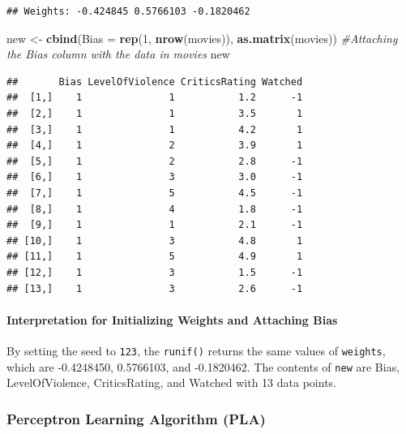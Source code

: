 \documentclass[
]{article}
\newenvironment{Shaded}{\begin{snugshade}}{\end{snugshade}}
\newcommand{\AttributeTok}[1]{\textcolor[rgb]{0.13,0.29,0.53}{#1}}
\newcommand{\CommentTok}[1]{\textcolor[rgb]{0.56,0.35,0.01}{\textit{#1}}}
\newcommand{\DecValTok}[1]{\textcolor[rgb]{0.00,0.00,0.81}{#1}}
\newcommand{\FunctionTok}[1]{\textcolor[rgb]{0.13,0.29,0.53}{\textbf{#1}}}
\newcommand{\NormalTok}[1]{#1}
\newcommand{\OtherTok}[1]{\textcolor[rgb]{0.56,0.35,0.01}{#1}}
\begin{document}
\begin{verbatim}
## Weights: -0.424845 0.5766103 -0.1820462
\end{verbatim}

\begin{Shaded}
\begin{Highlighting}[]
\NormalTok{new }\OtherTok{\textless{}{-}} \FunctionTok{cbind}\NormalTok{(}\AttributeTok{Bias =} \FunctionTok{rep}\NormalTok{(}\DecValTok{1}\NormalTok{, }\FunctionTok{nrow}\NormalTok{(movies)), }\FunctionTok{as.matrix}\NormalTok{(movies)) }\CommentTok{\#Attaching the Bias column with the data in movies}
\NormalTok{new}
\end{Highlighting}
\end{Shaded}

\begin{verbatim}
##       Bias LevelOfViolence CriticsRating Watched
##  [1,]    1               1           1.2      -1
##  [2,]    1               1           3.5       1
##  [3,]    1               1           4.2       1
##  [4,]    1               2           3.9       1
##  [5,]    1               2           2.8      -1
##  [6,]    1               3           3.0      -1
##  [7,]    1               5           4.5      -1
##  [8,]    1               4           1.8      -1
##  [9,]    1               1           2.1      -1
## [10,]    1               3           4.8       1
## [11,]    1               5           4.9       1
## [12,]    1               3           1.5      -1
## [13,]    1               3           2.6      -1
\end{verbatim}

\paragraph{Interpretation for Initializing Weights and Attaching
Bias}\label{interpretation-for-initializing-weights-and-attaching-bias}

By setting the seed to \texttt{123}, the \texttt{runif()} returns the
same values of \texttt{weights}, which are -0.4248450, 0.5766103, and
-0.1820462. The contents of \texttt{new} are Bias, LevelOfViolence,
CriticsRating, and Watched with 13 data points.

\subsubsection{Perceptron Learning Algorithm
(PLA)}\label{perceptron-learning-algorithm-pla}
\end{document}
